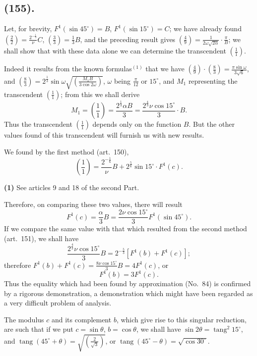 \documentclass{article}
\begin{document}
\subsection*{(155).}

Let, for brevity, $F^{1}(\sin 45^{\circ})=B$, $F^{1}(\sin 15^{\circ})=C$; we have already found $\left(\frac{2}{2}\right)=\frac{2^{-\frac{1}{3}}}{\nu}C$, $\left(\frac{3}{3}\right)=\frac{1}{3}B$, and the preceding result gives $\left(\frac{4}{9}\right)=\frac{1}{2\omega\sqrt{2\alpha}}\cdot\frac{\pi}{B}$; we shall show that with these data alone we can determine the transcendent $\left(\frac{1}{1}\right)$.

Indeed it results from the known formulas${}^{(1)}$ that we have $\left(\frac{4}{9}\right)\cdot\left(\frac{8}{3}\right)=\frac{\pi\sin\omega}{3\sqrt{6}}$, and $\left(\frac{8}{3}\right)=2^{\frac{1}{3}}\sin\omega\sqrt{\left(\frac{M_{1}B}{3\cos 2\omega}\right)}$, $\omega$ being $\frac{\pi}{12}$ or $15^{\circ}$, and $M_{1}$ representing the transcendent $\left(\frac{1}{1}\right)$; from this we shall derive
\[ M_{1}=\left(\frac{1}{1}\right)=\frac{2^{\frac{1}{3}}\alpha B}{3}=\frac{2^{\frac{4}{3}}\nu\cos 15^{\circ}}{3}\cdot B. \]
Thus the transcendent $\left(\frac{1}{1}\right)$ depends only on the function $B$. But the other values found of this transcendent will furnish us with new results.

We found by the first method (art.\ 150),
\[ \left(\frac{1}{1}\right)=\frac{2^{-\frac{1}{6}}}{\nu}B+2^{\frac{5}{6}}\sin 15^{\circ}\cdot F^{1}(c). \]

\textbf{(1)} See articles 9 and 18 of the second Part.


Therefore, on comparing these two values, there will result
\[ F^{1}(c)=\frac{\alpha}{3}B=\frac{2\nu\cos 15^{\circ}}{3}F^{1}(\sin 45^{\circ}). \]
If we compare the same value with that which resulted from the second method (art.\ 151), we shall have
\[ \frac{2^{\frac{4}{3}}\nu\cos 15^{\circ}}{3}B=2^{-\frac{5}{3}}[F^{1}(b)+F^{1}(c)]; \]
therefore $F^{1}(b)+F^{1}(c)=\frac{8\nu\cos 15^{\circ}}{3}B=4F^{1}(c)$, or
\[ F^{1}(b)=3F^{1}(c). \]
Thus the equality which had been found by approximation (No.~84) is confirmed by a rigorous demonstration, a demonstration which might have been regarded as a very difficult problem of analysis.

The modulus $c$ and its complement $b$, which give rise to this singular reduction, are such that if we put $c=\sin\theta$, $b=\cos\theta$, we shall have $\sin 2\theta=\operatorname{tang}^{2}15^{\circ}$, and $\operatorname{tang}(45^{\circ}+\theta)=\sqrt{\left(\frac{2}{\sqrt{3}}\right)}$, or $\operatorname{tang}(45^{\circ}-\theta)=\sqrt{\cos 30^{\circ}}$.
\end{document}
